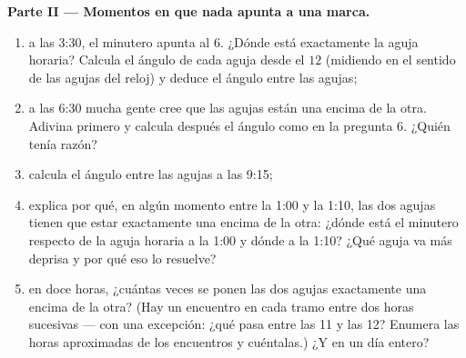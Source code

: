 \begin{problem}
\medskip
\noindent\textbf{Parte II --- Momentos en que nada apunta a una
marca.}
\begin{enumerate}[resume]
  \item a las 3:30, el minutero apunta al $6$. ¿Dónde está exactamente
        la aguja horaria? Calcula el ángulo de cada aguja desde el
        $12$ (midiendo en el sentido de las agujas del reloj) y deduce el ángulo entre
        las agujas;
  \item a las 6:30 mucha gente cree que las agujas están una encima de
        la otra. Adivina primero y calcula después el ángulo como en la pregunta
        6. ¿Quién tenía razón?
  \item calcula el ángulo entre las agujas a las 9:15;
  \item explica por qué, en algún momento entre la 1:00 y la 1:10, las dos
        agujas tienen que estar exactamente una encima de la otra: ¿dónde está el
        minutero respecto de la aguja horaria a la 1:00 y dónde
        a la 1:10? ¿Qué aguja va más deprisa y por qué eso lo resuelve?
  \item en doce horas, ¿cuántas veces se ponen las dos agujas
        exactamente una encima de la otra? (Hay un encuentro en
        cada tramo entre dos horas sucesivas --- con una
        excepción: ¿qué pasa entre las 11 y las 12? Enumera las horas
        aproximadas de los encuentros y cuéntalas.) ¿Y en un
        día entero?
\end{enumerate}


\end{problem}
